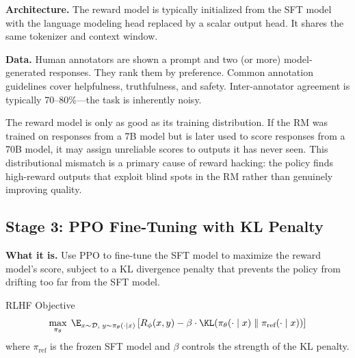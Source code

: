\textbf{Architecture.} The reward model is typically initialized from the SFT model with the language modeling head replaced by a scalar output head. It shares the same tokenizer and context window.

\textbf{Data.} Human annotators are shown a prompt and two (or more) model-generated responses. They rank them by preference. Common annotation guidelines cover helpfulness, truthfulness, and safety. Inter-annotator agreement is typically 70--80\%---the task is inherently noisy.

\begin{warningbox}
The reward model is only as good as its training distribution. If the RM was trained on responses from a 7B model but is later used to score responses from a 70B model, it may assign unreliable scores to outputs it has never seen. This distributional mismatch is a primary cause of reward hacking: the policy finds high-reward outputs that exploit blind spots in the RM rather than genuinely improving quality.
\end{warningbox}

\subsection{Stage 3: PPO Fine-Tuning with KL Penalty}

\textbf{What it is.} Use PPO to fine-tune the SFT model to maximize the reward model's score, subject to a KL divergence penalty that prevents the policy from drifting too far from the SFT model.

\begin{mathresult}{RLHF Objective}
\begin{equation}
\max_{\pi_\theta}\; \E_{x \sim \mathcal{D},\; y \sim \pi_\theta(\cdot \mid x)}\left[R_\phi(x, y) - \beta \cdot \KL\!\left(\pi_\theta(\cdot \mid x)\;\|\;\pi_{\text{ref}}(\cdot \mid x)\right)\right]
\end{equation}
where $\pi_{\text{ref}}$ is the frozen SFT model and $\beta$ controls the strength of the KL penalty.
\end{mathresult}

